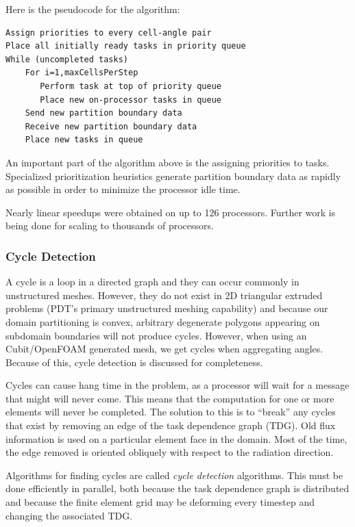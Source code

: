 \documentclass[11pt, letterpaper,titlepage,oneside]{article}
\begin{document}
Here is the pseudocode for the algorithm:

\begin{verbatim}
Assign priorities to every cell-angle pair
Place all initially ready tasks in priority queue
While (uncompleted tasks)
    For i=1,maxCellsPerStep
       Perform task at top of priority queue
       Place new on-processor tasks in queue
    Send new partition boundary data
    Receive new partition boundary data
    Place new tasks in queue 
\end{verbatim}

An important part of the algorithm above is the assigning priorities to tasks. Specialized prioritization heuristics generate partition boundary data as rapidly as possible in order to minimize the processor idle time. 

Nearly linear speedups were obtained on up to 126 processors. Further work is being done for scaling to thousands of processors. 

\subsubsection{Cycle Detection}

A cycle is a loop in a directed graph and they can occur commonly in unstructured meshes. However, they do not exist in 2D triangular extruded problems (PDT's primary unstructured meshing capability) and because our domain partitioning is convex, arbitrary degenerate polygons appearing on subdomain boundaries will not produce cycles. However, when using an Cubit/OpenFOAM generated mesh, we get cycles when aggregating angles. Because of this, cycle detection is discussed for completeness. 

Cycles can cause hang time in the problem, as a processor will wait for a message that might will never come. This means that the computation for one or more elements will never be completed. The solution to this is to ``break'' any cycles that exist by removing an edge of the task dependence graph (TDG). Old flux information is used on a particular element face in the domain. Most of the time, the edge removed is oriented obliquely with respect to the radiation direction. 

Algorithms for finding cycles are called \textit{cycle detection} algorithms. This must be done efficiently in parallel, both because the task dependence graph is distributed and because the finite element grid may be deforming every timestep and changing the associated TDG.
\end{document}
